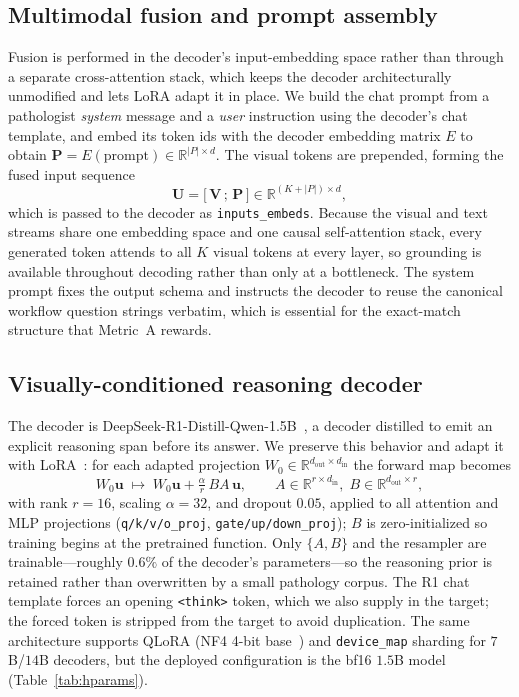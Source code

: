 \documentclass[11pt]{article}
\newcommand{\code}[1]{\texttt{\small #1}}
\newcommand{\R}{\mathbb{R}}
\newcommand{\Vvis}{\mathbf{V}}
\newcommand{\Prompt}{\mathbf{P}}
\begin{document}
\subsection{Multimodal fusion and prompt assembly}
\label{sec:fusion}
Fusion is performed in the decoder's input-embedding space rather than through a
separate cross-attention stack, which keeps the decoder architecturally
unmodified and lets LoRA adapt it in place. We build the chat prompt from a
pathologist \emph{system} message and a \emph{user} instruction using the
decoder's chat template, and embed its token ids with the decoder embedding matrix
$E$ to obtain $\Prompt = E(\text{prompt})\in\R^{|P|\times d}$. The visual tokens
are prepended, forming the fused input sequence
\begin{equation}
\mathbf{U} = \big[\,\Vvis\,;\,\Prompt\,\big]\in\R^{(K+|P|)\times d},
\end{equation}
which is passed to the decoder as \code{inputs\_embeds}. Because the visual and
text streams share one embedding space and one causal self-attention stack, every
generated token attends to all $K$ visual tokens at every layer, so grounding is
available throughout decoding rather than only at a bottleneck. The system prompt
fixes the output schema and instructs the decoder to reuse the canonical workflow
question strings verbatim, which is essential for the exact-match structure that
Metric~A rewards.

\subsection{Visually-conditioned reasoning decoder}
\label{sec:decoder}
The decoder is DeepSeek-R1-Distill-Qwen-1.5B~\cite{deepseek2025r1}, a decoder
distilled to emit an explicit reasoning span before its answer. We preserve this
behavior and adapt it with LoRA~\cite{hu2022lora}: for each adapted projection
$W_0\in\R^{d_{\text{out}}\times d_{\text{in}}}$ the forward map becomes
\begin{equation}
W_0\mathbf{u}\;\longmapsto\;W_0\mathbf{u}+\tfrac{\alpha}{r}\,BA\,\mathbf{u},
\qquad A\in\R^{r\times d_{\text{in}}},\;B\in\R^{d_{\text{out}}\times r},
\end{equation}
with rank $r{=}16$, scaling $\alpha{=}32$, and dropout $0.05$, applied to all
attention and MLP projections (\code{q/k/v/o\_proj}, \code{gate/up/down\_proj});
$B$ is zero-initialized so training begins at the pretrained function. Only
$\{A,B\}$ and the resampler are trainable---roughly $0.6\%$ of the decoder's
parameters---so the reasoning prior is retained rather than overwritten by a small
pathology corpus. The R1 chat template forces an opening \code{<think>} token,
which we also supply in the target; the forced token is stripped from the target
to avoid duplication. The same architecture supports QLoRA (NF4 4-bit
base~\cite{dettmers2023qlora}) and \code{device\_map} sharding for $7$B/$14$B
decoders, but the deployed configuration is the bf16 $1.5$B model
(Table~\ref{tab:hparams}).
\end{document}
